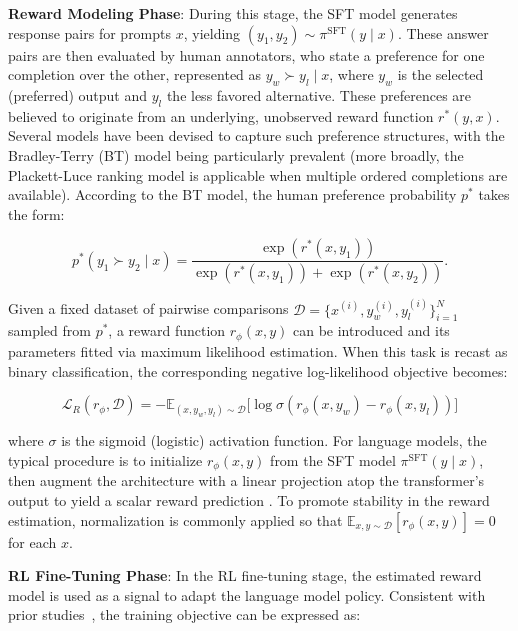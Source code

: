 \textbf{Reward Modeling Phase}: During this stage, the SFT model generates response pairs for prompts $x$, yielding $(y_1, y_2)\sim \pi^\text{SFT}(y \mid x)$. These answer pairs are then evaluated by human annotators, who state a preference for one completion over the other, represented as $y_w\succ y_l \mid x$, where $y_w$ is the selected (preferred) output and $y_l$ the less favored alternative. These preferences are believed to originate from an underlying, unobserved reward function $r^*(y, x)$. Several models have been devised to capture such preference structures, with the Bradley-Terry (BT) \cite{bradley1952rankanalysis} model being particularly prevalent (more broadly, the Plackett-Luce ranking model \citep{plackett1975analysis, luce2012individual} is applicable when multiple ordered completions are available). According to the BT model, the human preference probability $p^*$ takes the form:

\begin{equation}\label{eq:bradley-terry}
    p^*(y_1\succ y_2 \mid x)=\frac{\exp\left(r^*(x, y_1)\right)}{\exp\left(r^*(x, y_1)\right) + \exp\left(r^*(x, y_2)\right)}.
\end{equation}

Given a fixed dataset of pairwise comparisons $\mathcal{D}=\bigl\{x^{(i)}, y_w^{(i)}, y_l^{(i)}\bigr\}_{i=1}^N$ sampled from $p^*$, a reward function $r_{\phi}(x, y)$ can be introduced and its parameters fitted via maximum likelihood estimation. When this task is recast as binary classification, the corresponding negative log-likelihood objective becomes:

\begin{equation}\label{eq:reward_model}
    \mathcal{L}_R(r_{\phi}, \mathcal{D}) = -\mathbb{E}_{(x, y_w, y_l)\sim \mathcal{D}}\bigl[\log \sigma(r_{\phi}(x, y_w)- r_{\phi}(x, y_l))\bigr]
\end{equation}

where $\sigma$ is the sigmoid (logistic) activation function. For language models, the typical procedure is to initialize $r_{\phi}(x, y)$ from the SFT model $\pi^\text{SFT}(y \mid x)$, then augment the architecture with a linear projection atop the transformer’s output to yield a scalar reward prediction \cite{ziegler2020finetuning}. To promote stability in the reward estimation, normalization is commonly applied so that $\mathbb{E}_{x,y\sim \mathcal{D}}\left[r_\phi(x, y)\right] = 0$ for each $x$.

\textbf{RL Fine-Tuning Phase}: In the RL fine-tuning stage, the estimated reward model is used as a signal to adapt the language model policy. Consistent with prior studies~\citep{jaques2017sequence, jaques2020human}, the training objective can be expressed as:

